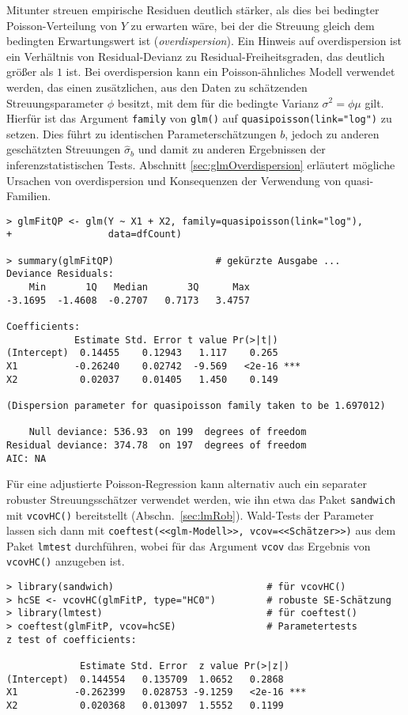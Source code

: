 Mitunter streuen empirische Residuen deutlich stärker, als dies bei bedingter Poisson-Verteilung von $Y$ zu erwarten wäre, bei der die Streuung gleich dem bedingten Erwartungswert ist (\emph{overdispersion}). Ein Hinweis auf overdispersion ist ein Verhältnis von Residual-Devianz zu Residual-Freiheitsgraden, das deutlich größer als $1$ ist. Bei overdispersion kann ein Poisson-ähnliches Modell verwendet werden, das einen zusätzlichen, aus den Daten zu schätzenden Streuungsparameter $\phi$ besitzt, mit dem für die bedingte Varianz $\sigma^{2} = \phi \mu$ gilt. Hierfür ist das Argument \lstinline!family! von \lstinline!glm()! auf \lstinline!quasipoisson(link="log")! zu setzen. Dies führt zu identischen Parameterschätzungen $b$, jedoch zu anderen geschätzten Streuungen $\hat{\sigma}_{b}$ und damit zu anderen Ergebnissen der inferenzstatistischen Tests. Abschnitt \ref{sec:glmOverdispersion} erläutert mögliche Ursachen von overdispersion und Konsequenzen der Verwendung von quasi-Familien.
\begin{lstlisting}
> glmFitQP <- glm(Y ~ X1 + X2, family=quasipoisson(link="log"),
+                 data=dfCount)

> summary(glmFitQP)                  # gekürzte Ausgabe ...
Deviance Residuals:
    Min       1Q   Median       3Q      Max
-3.1695  -1.4608  -0.2707   0.7173   3.4757

Coefficients:
            Estimate Std. Error t value Pr(>|t|)
(Intercept)  0.14455    0.12943   1.117    0.265
X1          -0.26240    0.02742  -9.569   <2e-16 ***
X2           0.02037    0.01405   1.450    0.149

(Dispersion parameter for quasipoisson family taken to be 1.697012)

    Null deviance: 536.93  on 199  degrees of freedom
Residual deviance: 374.78  on 197  degrees of freedom
AIC: NA
\end{lstlisting}

Für eine adjustierte Poisson-Regression kann alternativ auch ein separater robuster Streuungsschätzer verwendet werden, wie ihn etwa das Paket \lstinline!sandwich! mit \lstinline!vcovHC()! bereitstellt (Abschn.\ \ref{sec:lmRob}). Wald-Tests der Parameter lassen sich dann mit \lstinline!coeftest(<<glm-Modell>>, vcov=<<Schätzer>>)! aus dem Paket  \lstinline!lmtest! durchführen, wobei für das Argument \lstinline!vcov! das Ergebnis von \lstinline!vcovHC()! anzugeben ist.
\begin{lstlisting}
> library(sandwich)                           # für vcovHC()
> hcSE <- vcovHC(glmFitP, type="HC0")         # robuste SE-Schätzung
> library(lmtest)                             # für coeftest()
> coeftest(glmFitP, vcov=hcSE)                # Parametertests
z test of coefficients:

             Estimate Std. Error  z value Pr(>|z|)
(Intercept)  0.144554   0.135709  1.0652   0.2868
X1          -0.262399   0.028753 -9.1259   <2e-16 ***
X2           0.020368   0.013097  1.5552   0.1199
\end{lstlisting}

